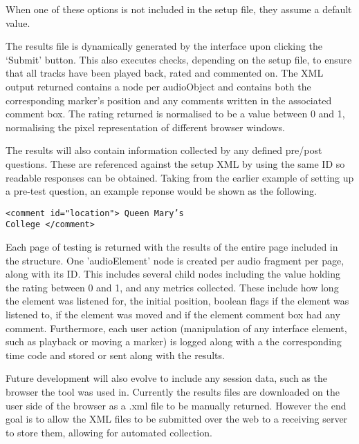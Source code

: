 \documentclass{article}
\begin{document}
When one of these options is not included in the setup file, they assume a default value. 


The results file is dynamically generated by the interface upon clicking the `Submit' button. This also executes checks, depending on the setup file, to ensure that all tracks have been played back, rated and commented on. The XML output returned contains a node per audioObject and contains both the corresponding marker's position and any comments written in the associated comment box. The rating returned is normalised to be a value between 0 and 1, normalising the pixel representation of different browser windows.

The results will also contain information collected by any defined pre/post questions. These are referenced against the setup XML by using the same ID so readable responses can be obtained. Taking from the earlier example of setting up a pre-test question, an example reponse would be shown as the following.

\texttt{<comment id="location"> Queen Mary's \\ College </comment>}

Each page of testing is returned with the results of the entire page included in the structure. One 'audioElement' node is created per audio fragment per page, along with its ID. This includes several child nodes including the value holding the rating between 0 and 1, and any metrics collected. These include how long the element was listened for, the initial position, boolean flags if the element was listened to, if the element was moved and if the element comment box had any comment. Furthermore, each user action (manipulation of any interface element, such as playback or moving a marker) is logged along with a the corresponding time code and stored or sent along with the results.

Future development will also evolve to include any session data, such as the browser the tool was used in. Currently the results files are downloaded on the user side of the browser as a .xml file to be manually returned. However the end goal is to allow the XML files to be submitted over the web to a receiving server to store them, allowing for automated collection.


\end{document}

